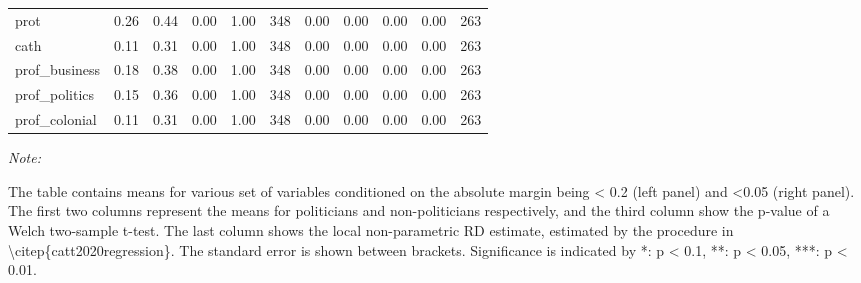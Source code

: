 \begin{table}[!h]
\begin{threeparttable}
{\begin{tabular}[t]{lrrrrrrrrrr}
\hspace{1em}prot & \num{0.26} & \num{0.44} & \num{0.00} & \num{1.00} & 348 & \num{0.00} & \num{0.00} & \num{0.00} & \num{0.00} & 263\\
\hspace{1em}cath & \num{0.11} & \num{0.31} & \num{0.00} & \num{1.00} & 348 & \num{0.00} & \num{0.00} & \num{0.00} & \num{0.00} & 263\\
\hspace{1em}prof\_business & \num{0.18} & \num{0.38} & \num{0.00} & \num{1.00} & 348 & \num{0.00} & \num{0.00} & \num{0.00} & \num{0.00} & 263\\
\hspace{1em}prof\_politics & \num{0.15} & \num{0.36} & \num{0.00} & \num{1.00} & 348 & \num{0.00} & \num{0.00} & \num{0.00} & \num{0.00} & 263\\
\hspace{1em}prof\_colonial & \num{0.11} & \num{0.31} & \num{0.00} & \num{1.00} & 348 & \num{0.00} & \num{0.00} & \num{0.00} & \num{0.00} & 263\\
\bottomrule
\end{tabular}}
\begin{tablenotes}
\item \textit{Note: } 
\item The table contains means for various set of variables conditioned on the absolute margin being < 0.2 (left panel) and <0.05 (right panel). The first two columns represent the means for politicians and non-politicians respectively, and the third column show the p-value of a Welch two-sample t-test. The last column shows the local non-parametric RD estimate, estimated by the procedure in \textbackslash{}citep\{catt2020regression\}. The standard error is shown between brackets. Significance is indicated by *: p < 0.1, **: p < 0.05, ***: p < 0.01.
\end{tablenotes}
\end{threeparttable}
\end{table}
